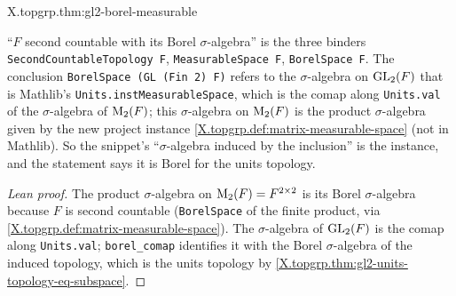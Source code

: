 \begin{theorem}
\end{theorem}
\begin{tfformal}{X.topgrp.thm:gl2-borel-measurable}
\begin{tffidelity}
``$F$ second countable with its Borel $\sigma$-algebra'' is the three binders \texttt{SecondCountableTopology F}, \texttt{MeasurableSpace F}, \texttt{BorelSpace F}. The conclusion \texttt{BorelSpace (GL (Fin 2) F)} refers to the $\sigma$-algebra on $\mathrm{GL}_2(F)$ that is Mathlib's \texttt{Units.instMeasurableSpace}, which is the comap along \texttt{Units.val} of the $\sigma$-algebra of $\mathrm{M}_2(F)$; this $\sigma$-algebra on $\mathrm{M}_2(F)$ is the product $\sigma$-algebra given by the new project instance \cref{X.topgrp.def:matrix-measurable-space} (not in Mathlib). So the snippet's ``$\sigma$-algebra induced by the inclusion'' is the instance, and the statement says it is Borel for the units topology.
\end{tffidelity}
\end{tfformal}
\begin{proof}[Lean proof]
The product $\sigma$-algebra on $\mathrm{M}_2(F)=F^{2\times2}$ is its Borel $\sigma$-algebra because $F$ is second countable (\texttt{BorelSpace} of the finite product, via \cref{X.topgrp.def:matrix-measurable-space}). The $\sigma$-algebra of $\mathrm{GL}_2(F)$ is the comap along \texttt{Units.val}; \texttt{borel\_comap} identifies it with the Borel $\sigma$-algebra of the induced topology, which is the units topology by \cref{X.topgrp.thm:gl2-units-topology-eq-subspace}.
\end{proof}

